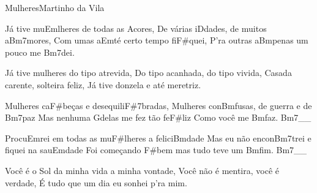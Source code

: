 \begin{musica}{Mulheres}{Martinho da Vila}{}

Já tive mu\ac{Em}{lhe}res de todas as \ac{A}{co}res,
De várias i\ac{D}{da}des, de muitos a\ac{Bm7}{mo}res,
Com umas a\ac{Em}{té} certo tempo fi\ac{F#}{quei},
P’ra outras a\ac{Bm}{pe}nas um pouco me \ac{Bm7}{dei}.

Já tive mulheres do tipo atrevida,
Do tipo acanhada, do tipo vivida,
Casada carente, solteira feliz,
Já tive donzela e até meretriz.

Mulheres ca\ac{F#}{be}ças e desequili\ac{F#7}{bra}das,
Mulheres con\ac{Bm}{fu}sas, de guerra e de \ac{Bm7}{paz}
Mas nenhuma \ac{G}{de}las me fez tão fe\ac{F#}{liz}
Como você me \ac{Bm}{faz}. \ac{Bm7}{}__

Procu\ac{Em}{rei} em todas as mu\ac{F#}{lhe}res a felici\ac{Bm}{da}de
Mas eu não encon\ac{Bm7}{trei} e fiquei na sau\ac{Em}{da}de
Foi começando \ac{F#}{bem} mas tudo teve um \ac{Bm}{fim}. \ac{Bm7}{}__

Você é o Sol da minha vida a minha vontade,
Você não é mentira, você é verdade,
É tudo que um dia eu sonhei p’ra mim.

\end{musica}
